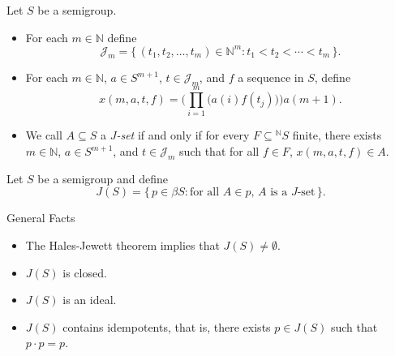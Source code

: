 \documentclass{beamer}
\newcommand{\bbN}{\mathbb{N}}
\newcommand{\calJ}{\mathcal{J}}
\begin{document}
\begin{frame}
  \begin{definition}
    Let $S$ be a semigroup.
    \begin{itemize}
      \item For each $m \in \bbN$ define
        \[
          \calJ_m = \{\, (t_1, t_2, \ldots, t_m) \in \bbN^m : t_1 <
          t_2 < \cdots < t_m \,\}.
        \]
        \pause

      \item For each $m \in \bbN$, $a \in S^{m+1}$, $t \in \calJ_m$,
        and $f$ a sequence in $S$, define
        \vspace{-1em}
        \[
          x(m, a, t, f) = \biggl( \prod_{i=1}^m \bigl( a(i) f(t_j)
          \bigr) \biggr) a(m+1).
        \]
        \pause

      \item We call $A \subseteq S$ a \textsl{$J$-set} if and only if
        for every $F \subseteq \mbox{$^{\bbN}{S}$}$ finite, there exists $m \in
        \bbN$, $a \in S^{m+1}$, and $t \in \calJ_m$ such that for all
        $f \in F$, $x(m, a, t, f) \in A$.      
    \end{itemize}
  \end{definition}
\end{frame}

\begin{frame}
  \begin{definition}
    Let $S$ be a semigroup and define 
    \[
      J(S) = \{\, p \in \beta S : \mbox{for all $A \in p$, $A$ is a
        $J$-set} \,\}.
    \]
  \end{definition}

  \pause

  \begin{block}{General Facts}
    \begin{itemize}
      \item The Hales-Jewett theorem implies that $J(S) \ne
        \emptyset$. 
        \pause

      \item  $J(S)$ is closed.
        \pause

      \item  $J(S)$ is an ideal.
        \pause

      \item $J(S)$ contains idempotents, that is, there exists $p \in
        J(S)$ such that $p \cdot p = p$.
    \end{itemize}
  \end{block}
\end{frame}
\end{document}
